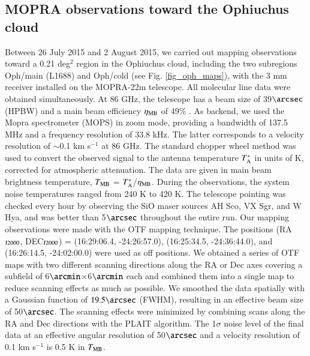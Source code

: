 \documentclass{aa}
\begin{document}
\subsection{MOPRA observations toward the Ophiuchus cloud}
Between 26 July 2015 and 2 August 2015, we carried out mapping observations toward a 0.21 deg$^2$ region in the Ophiuchus cloud, {including the two subregions Oph/main (L1688) and Oph/cold (see Fig. \ref{fig_oph_maps})}, with the 3 mm receiver installed on the MOPRA-22m telescope. All molecular line data were obtained simultaneously.  At 86 GHz, the telescope has a beam size of 39$\arcsec$ (HPBW) and a main beam efficiency $\eta_{\rm MB}$ of 49\% \citep{Ladd05}. As backend, we used the Mopra spectrometer (MOPS) in zoom mode, providing a bandwidth of 137.5 MHz and a frequency resolution of 33.8 kHz. The latter corresponds to a velocity resolution of $\sim$0.1 km s$^{-1}$ at 86 GHz. The standard chopper wheel method was used to convert the observed signal to the antenna temperature $T_{\rm A}^*$ in units of K, corrected for atmospheric attenuation. 
The data are given in main beam brightness temperature, $T_{\rm MB}$ = $T_{\rm A}^*$/$\eta_{\rm MB}$. 
During the  observations, the system noise temperatures ranged from 240 K to 420 K.
The telescope pointing was checked every hour by observing the SiO maser sources AH Sco, VX Sgr, and W Hya, and was better than 5$\arcsec$ throughout the entire run.  
Our mapping observations were made with the OTF mapping technique. The positions (RA$_{\rm J2000}$, DEC$_{\rm J2000}$) = (16:29:06.4, -24:26:57.0), (16:25:34.5, -24:36:44.0), and (16:26:14.5, -24:02:00.0) were used as off positions. We obtained a series of OTF maps with two different scanning directions along the RA or Dec axes covering a subfield of 6$\arcmin$$\times$6$\arcmin$ each and combined them into a single map to reduce scanning effects as much as possible.  
We smoothed the data spatially with a Gaussian function of $19.5\arcsec$ (FWHM), resulting in an effective beam size of 50$\arcsec$. 
The scanning effects were minimized by combining scans along the RA and Dec directions with the \citet{Emerson88} PLAIT algorithm. 
The 1$\sigma$ noise level of the final data at an effective angular resolution of 50$\arcsec$ and a velocity resolution of 0.1 km s$^{-1}$ is 0.5 K in $T_{\rm MB}$.

\end{document}
